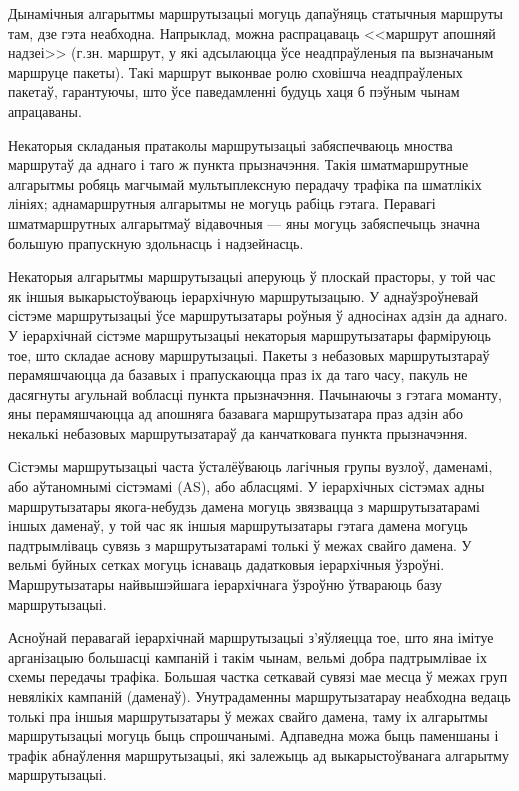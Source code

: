 Дынамічныя алгарытмы маршрутызацыі могуць дапаўняць статычныя маршруты там, дзе гэта неабходна. Напрыклад, можна распрацаваць <<маршрут апошняй надзеі>> (г.зн. маршрут, у які адсылаюцца ўсе неадпраўленыя па вызначаным маршруце пакеты). Такі маршрут выконвае ролю сховішча неадпраўленых 
пакетаў, гарантуючы, што ўсе паведамленні будуць хаця б пэўным чынам апрацаваны.

Некаторыя складаныя пратаколы маршрутызацыі забяспечваюць мноства маршрутаў да аднаго і таго ж пункта прызначэння. Такія шматмаршрутные алгарытмы робяць магчымай мультыплексную перадачу трафіка па шматлікіх лініях; аднамаршрутныя алгарытмы не могуць рабіць гэтага.
Перавагі шматмаршрутных алгарытмаў відавочныя --- яны могуць забяспечыць значна большую прапускную здольнасць і надзейнасць.

Некаторыя алгарытмы маршрутызацыі аперуюць ў плоскай
прасторы, у той час як іншыя выкарыстоўваюць іерархічную маршрутызацыю. У аднаўзроўневай сістэме маршрутызацыі ўсе маршрутызатары роўныя ў адносінах адзін да аднаго. У іерархічнай сістэме маршрутызацыі некаторыя маршрутызатары фарміруюць тое, што складае аснову маршрутызацыі.
Пакеты з небазовых маршрутызтараў перамяшчаюцца да базавых і прапускаюцца праз іх да таго часу, пакуль не дасягнуты агульнай вобласці пункта прызначэння. Пачынаючы з гэтага моманту, яны перамяшчаюцца ад апошняга базавага маршрутызатара праз адзін або некалькі небазовых маршрутызатараў да канчатковага пункта прызначэння.

Сістэмы маршрутызацыі часта ўсталёўваюць лагічныя групы вузлоў, даменамі, або аўтаномнымі сістэмамі (AS), або абласцямі. У іерархічных сістэмах адны маршрутызатары якога-небудзь дамена могуць звязвацца з маршрутызатарамі іншых даменаў, у той час як іншыя маршрутызатары гэтага дамена могуць падтрымліваць сувязь з маршрутызатарамі толькі ў межах свайго дамена. У вельмі буйных сетках могуць існаваць дадатковыя іерархічныя ўзроўні. Маршрутызатары найвышэйшага іерархічнага ўзроўню ўтвараюць базу маршрутызацыі.

Асноўнай перавагай іерархічнай маршрутызацыі з'яўляецца тое, што яна імітуе арганізацыю большасці кампаній і такім чынам, вельмі добра падтрымлівае іх схемы передачы трафіка. Большая частка сеткавай сувязі мае месца ў межах груп невялікіх кампаній (даменаў). Унутрадаменны маршрутызатарау неабходна ведаць толькі пра іншыя маршрутызатары ў межах свайго дамена, таму іх алгарытмы маршрутызацыі могуць быць спрошчанымі. Адпаведна можа быць паменшаны і трафік абнаўлення маршрутызацыі, які залежыць ад выкарыстоўванага алгарытму маршрутызацыі.

